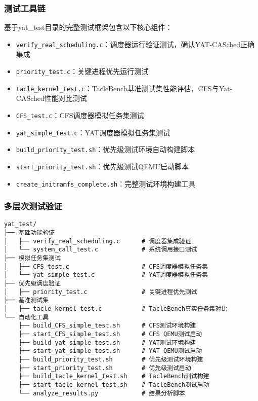 \subsubsection{测试工具链}
基于yat\_test目录的完整测试框架包含以下核心组件：

\begin{itemize}
    \item \texttt{verify\_real\_scheduling.c}：调度器运行验证测试，确认YAT-CASched正确集成
    \item \texttt{priority\_test.c}：关键进程优先运行测试
    \item \texttt{tacle\_kernel\_test.c}：TacleBench基准测试集性能评估，CFS与Yat-CASched性能对比测试
    \item \texttt{CFS\_test.c}：CFS调度器模拟任务集测试
    \item \texttt{yat\_simple\_test.c}：YAT调度器模拟任务集测试
    \item \texttt{build\_priority\_test.sh}：优先级测试环境自动构建脚本
    \item \texttt{start\_priority\_test.sh}：优先级测试QEMU启动脚本
    \item \texttt{create\_initramfs\_complete.sh}：完整测试环境构建工具
    
\end{itemize}

\subsubsection{多层次测试验证}
\begin{tcolorbox} [
    enhanced,
    colback=green!5,
    colframe=green!40!black,
    leftrule=3mm,
    rightrule=0mm,
    toprule=0mm,
    bottomrule=0mm,
    arc=2mm,
    left=5mm,
    right=5mm,
    top=3mm,
    bottom=3mm,
    fonttitle=\bfseries,
    title=\textbf{测试框架架构}
]
\begin{lstlisting}[basicstyle=\footnotesize\fontfamily{zi4}\selectfont, showstringspaces=false]
yat_test/
├── 基础功能验证
│   ├── verify_real_scheduling.c      # 调度器集成验证
│   └── system_call_test.c            # 系统调用接口测试
├── 模拟任务集测试  
│   ├── CFS_test.c                    # CFS调度器模拟任务集
│   └── yat_simple_test.c             # YAT调度器模拟任务集
├── 优先级调度验证
│   ├── priority_test.c               # 关键进程优先测试
├── 基准测试集
│   ├── tacle_kernel_test.c           # TacleBench真实任务集对比
└── 自动化工具
    ├── build_CFS_simple_test.sh      # CFS测试环境构建
    ├── start_CFS_simple_test.sh      # CFS QEMU测试启动
    ├── build_yat_simple_test.sh      # YAT测试环境构建
    ├── start_yat_simple_test.sh      # YAT QEMU测试启动
    ├── build_priority_test.sh        # 优先级测试环境构建
    ├── start_priority_test.sh        # 优先级测试启动
    ├── build_tacle_kernel_test.sh    # TacleBench测试构建
    ├── start_tacle_kernel_test.sh    # TacleBench测试启动
    └── analyze_results.py            # 结果分析脚本
\end{lstlisting}
\end{tcolorbox}

